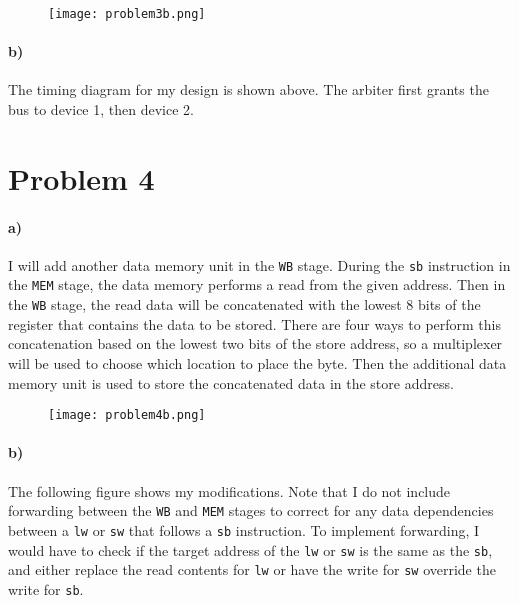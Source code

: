\documentclass[12pt]{article}
\begin{document}
\begin{figure}[!ht]
        \begin{center}
                \texttt{[image: problem3b.png]}
        \end{center}
\end{figure}

\paragraph{b)}

The timing diagram for my design is shown above. The arbiter first grants the bus to device 1, then device 2.

\section*{Problem 4}

\paragraph{a)}

I will add another data memory unit in the \texttt{WB} stage. During the \texttt{sb} instruction in the \texttt{MEM} stage, the data memory
performs a read from the given address. Then in the \texttt{WB} stage, the read data will be concatenated with the lowest 8 bits of the register
that contains the data to be stored. There are four ways to perform this concatenation based on the lowest two bits of the store address, so a multiplexer
will be used to choose which location to place the byte. Then the additional data memory unit is used to store the concatenated data in the store address.

\begin{figure}[!ht]
        \begin{center}
                \hspace*{-4cm}
                \texttt{[image: problem4b.png]}
                \hspace*{-4cm}
        \end{center}
\end{figure}

\paragraph{b)}

The following figure shows my modifications. Note that I do not include forwarding between the \texttt{WB} and \texttt{MEM} stages to correct for any data dependencies
between a \texttt{lw} or \texttt{sw} that follows a \texttt{sb} instruction. To implement forwarding, I would have to check if the target address of the \texttt{lw} or
\texttt{sw} is the same as the \texttt{sb}, and either replace the read contents for \texttt{lw} or have the write for \texttt{sw} override the write for \texttt{sb}.
\end{document}
